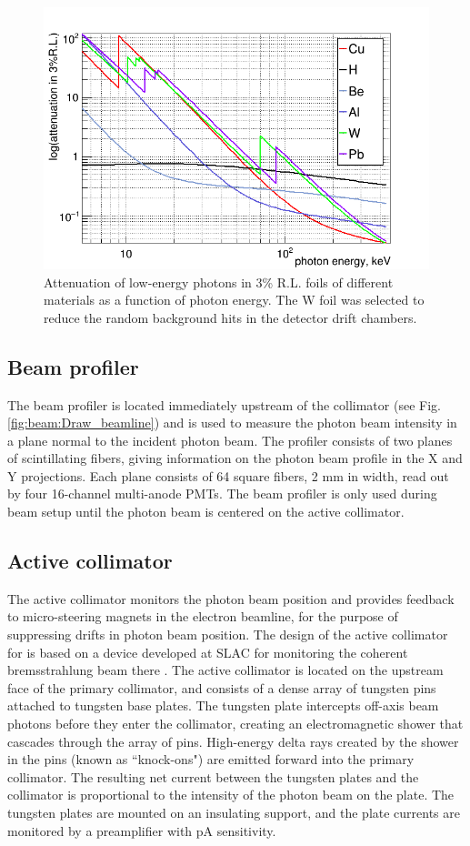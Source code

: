 \begin{figure}[tbp]
\begin{center}
\includegraphics[width=0.5\linewidth]{figures/Attenuation.png}
\caption{Attenuation of low-energy photons in 3\% R.L. foils of different materials as a function of photon energy. The W foil was selected to reduce the random background hits in the detector drift chambers.
\label{fig:attenuation}  }
\end{center}
\end{figure}


\subsection{Beam profiler}
The beam profiler is located immediately upstream of the collimator (see Fig.\,\ref{fig:beam:Draw_beamline}) and is
used to measure the photon beam intensity in a plane normal to the incident
photon beam. The profiler consists of two planes
of scintillating fibers, giving information on the photon beam profile
in the X and Y projections. Each plane consists of 64 square fibers,
2 mm in width, read out by four 16-channel multi-anode PMTs. The beam profiler
is only used during beam setup until the photon beam is centered on the active collimator.

\subsection{Active collimator \label{sec:coll}}
The active collimator monitors the photon beam position and provides
feedback to micro-steering magnets in the electron beamline, for the
purpose of suppressing drifts in photon beam position. 
The
design of the active collimator for \GX{} is based on a device 
developed at SLAC for monitoring
the coherent bremsstrahlung beam there \cite{Miller:1973yi}.
The \GX{} active collimator is located on
the upstream face of the primary collimator, and consists of a dense
array of tungsten pins attached to tungsten base plates. The tungsten
plate intercepts off-axis beam photons before they enter the collimator,
creating an electromagnetic shower that cascades through the array
of pins. High-energy delta rays created by the
shower in the pins (known as ``knock-ons") 
are emitted forward into the primary collimator. The resulting net current between the tungsten plates and the collimator is proportional to the intensity of the photon beam on the plate.
The tungsten plates are mounted on an insulating support, and the plate
currents are monitored by a preamplifier with pA sensitivity. 

